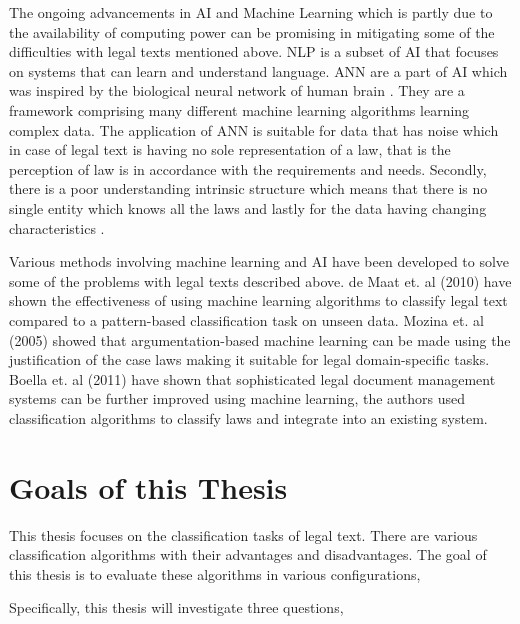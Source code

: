 The ongoing advancements in \gls{AI} and Machine Learning which is partly due to the availability of computing power can be promising in mitigating some of the difficulties with legal texts mentioned above. \gls{NLP} is a subset of \gls{AI} that focuses on systems that can learn and understand language. \gls{ANN} are a part of AI which was inspired by the biological neural network of human brain \cite{van2018artificial}. They are a framework comprising many different machine learning algorithms learning complex data. The application of \gls{ANN} is suitable for data that has noise which in case of legal text is having no sole representation of a law, that is the perception of law is in accordance with the requirements and needs. Secondly, there is a poor understanding intrinsic structure which means that there is no single entity which knows all the laws and lastly for the data having changing characteristics \cite{merkl1997exploration}. 

Various methods involving machine learning and \gls{AI} have been developed to solve some of the problems with legal texts described above. de Maat et. al (2010) \cite{de2010machine} have shown the effectiveness of using machine learning algorithms to classify legal text compared to a pattern-based classification task on unseen data. Mozina et. al (2005) \cite{movzina2005argument} showed that argumentation-based machine learning can be made using the justification of the case laws making it suitable for legal domain-specific tasks. Boella et. al (2011) \cite{boella2011using} have shown that sophisticated legal document management systems can be further improved using machine learning, the authors used classification algorithms to classify laws and integrate into an existing system. 



\section{Goals of this Thesis}
This thesis focuses on the classification tasks of legal text. There are various classification algorithms with their advantages and disadvantages. The goal of this thesis is to evaluate these algorithms in various configurations, 

Specifically, this thesis will investigate three questions,


